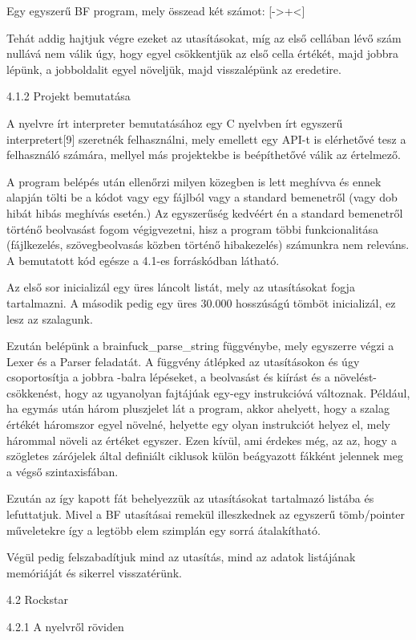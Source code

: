 Egy egyszerű BF program, mely összead két számot: [->+<]

Tehát addig hajtjuk végre ezeket az utasításokat, míg az első cellában lévő szám nullává nem válik úgy, hogy egyel csökkentjük az első cella értékét, majd jobbra lépünk, a jobboldalit egyel növeljük, majd visszalépünk az eredetire.

4.1.2 Projekt bemutatása

A nyelvre írt interpreter bemutatásához egy C nyelvben írt egyszerű interpretert[9] szeretnék felhasználni, mely emellett egy API-t is elérhetővé tesz a felhasználó számára, mellyel más projektekbe is beépíthetővé válik az értelmező.

A program belépés után ellenőrzi milyen közegben is lett meghívva és ennek alapján tölti be a kódot vagy egy fájlból vagy a standard bemenetről (vagy dob hibát hibás meghívás esetén.) Az egyszerűség kedvéért én a standard bemenetről történő beolvasást fogom végigvezetni, hisz a program többi funkcionalitása (fájlkezelés, szövegbeolvasás közben történő hibakezelés) számunkra nem releváns. A bemutatott kód egésze a 4.1-es forráskódban látható.

Az első sor inicializál egy üres láncolt listát, mely az utasításokat fogja tartalmazni. A második pedig egy üres 30.000 hosszúságú tömböt inicializál, ez lesz az szalagunk. 

Ezután belépünk a brainfuck\_parse\_string függvénybe, mely egyszerre végzi a Lexer és a Parser feladatát. A függvény átlépked az utasításokon és úgy csoportosítja a jobbra -balra lépéseket, a beolvasást és kiírást és a növelést-csökkenést, hogy az ugyanolyan fajtájúak egy-egy instrukcióvá változnak. Például, ha egymás után három pluszjelet lát a program, akkor ahelyett, hogy a szalag értékét háromszor egyel növelné, helyette egy olyan instrukciót helyez el, mely hárommal növeli az értéket egyszer. Ezen kívül, ami érdekes még, az az, hogy a szögletes zárójelek által definiált ciklusok külön beágyazott fákként jelennek meg a végső szintaxisfában.

Ezután az így kapott fát behelyezzük az utasításokat tartalmazó listába és lefuttatjuk. Mivel a BF utasításai remekül illeszkednek az egyszerű tömb/pointer műveletekre így a legtöbb elem szimplán egy sorrá átalakítható.

Végül pedig felszabadítjuk mind az utasítás, mind az adatok listájának memóriáját és sikerrel visszatérünk.

4.2 Rockstar

4.2.1 A nyelvről röviden

